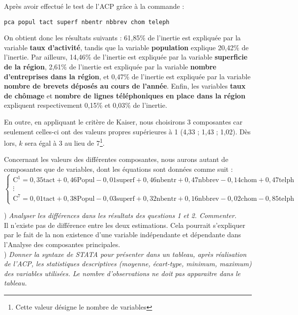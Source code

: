 Après avoir effectué le test de l'ACP grâce à la commande : 
\begin{lstlisting}[style=Stata]
	pca popul tact superf nbentr nbbrev chom teleph
\end{lstlisting}

On obtient donc les résultats suivants : 61,85\% de l'inertie est expliquée par la variable \textbf{taux d'activité}, tandis que la variable \textbf{population} explique 20,42\% de l'inertie. Par ailleurs, 14,46\% de l'inertie est expliquée par la variable \textbf{superficie de la région}, 2,61\% de l'inertie est expliquée par la variable \textbf{nombre d'entreprises dans la région}, et 0,47\% de l'inertie est expliquée par la variable \textbf{nombre de brevets déposés au cours de l'année}. Enfin, les variables \textbf{taux de chômage} et \textbf{nombre de lignes téléphoniques en place dans la région} expliquent respectivement 0,15\% et 0,03\% de l'inertie.

En outre, en appliquant le critère de Kaiser, nous choisirons 3 composantes car seulement celles-ci ont des valeurs propres supérieures à 1 (4,33 ; 1,43 ; 1,02). Dès lors, $k$ sera égal à 3 au lieu de 7\footnote{Cette valeur désigne le nombre de variables}.

Concernant les valeurs des différentes composantes, nous aurons autant de composantes que de variables, dont les équations sont données comme suit : \vspace*{-.5cm}
\[
\begin{cases}
	\text{C}^1 =  0,35 \text{tact} + 0,46 \text{Popul} - 0,01 \text{superf} + 0,46 \text{nbentr} + 0,47 \text{nbbrev} - 0,14 \text{chom} + 0,47 \text{telph}\\
	\vdots\\
	\text{C}^7 =  0,01 \text{tact} + 0,38 \text{Popul} - 0,03 \text{superf} + 0,32 \text{nbentr} + 0,16 \text{nbbrev} - 0,02 \text{chom} - 0,85 \text{telph}
\end{cases}
\] 

) \textit{Analyser les différences dans les résultats des questions 1 et 2. Commenter.} \\

Il n'existe pas de différence entre les deux estimations. Cela pourrait s'expliquer par le fait de la non existence d'une variable indépendante et dépendante dans l'Analyse des composantes principales.\\

) \textit{Donner la syntaxe de STATA pour présenter dans un tableau, après réalisation de l’ACP, les statistiques descriptives (moyenne, écart-type, minimum, maximum) des variables utilisées. Le nombre d’observations ne doit pas apparaitre dans le tableau.} \\

